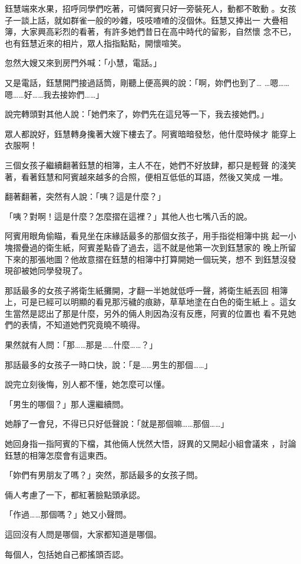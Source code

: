 鈺慧端來水果，招呼同學們吃著，可憐阿賓只好一旁裝死人，動都不敢動
。女孩子一談上話，就如群雀一般的吵雜，吱吱喳喳的沒個休。鈺慧又捧出一
大疊相簿，大家興高彩烈的看著，有許多她們昔日在高中時代的留影，自然懷
念不已，也有鈺慧近來的相片，眾人指指點點，開懷喧笑。

忽然大嫂又來到房門外喊：「小慧，電話。」

又是電話，鈺慧開門接過話筒，剛聽上便高興的說：「啊，妳們也到了…
…嗯……嗯……好……我去接妳們……」

說完轉頭對其他人說：「她們來了，妳們先在這兒等一下，我去接她們。」

眾人都說好，鈺慧轉身攙著大嫂下樓去了。阿賓暗暗發愁，他什麼時候才
能穿上衣服啊！

三個女孩子繼續翻著鈺慧的相簿，主人不在，她們不好放肆，都只是輕聲
的淺笑著，看著鈺慧和阿賓越來越多的合照，便相互低低的耳語，然後又笑成
一堆。

翻著翻著，突然有人說：「咦？這是什麼？」

「咦？對啊！這是什麼？怎麼摺在這裡？」其他人也七嘴八舌的說。

阿賓用眼角偷瞄，看見坐在床緣話最多的那個女孩子，用手指從相簿中挑
起一小塊摺疊過的衛生紙，阿賓差點昏了過去，這不就是他第一次到鈺慧家的
晚上所留下來的那張地圖？他故意摺在鈺慧的相簿中打算開她一個玩笑，想不
到鈺慧沒發現卻被她同學發現了。

那話最多的女孩子將衛生紙攤開，才翻一半她就低呼一聲，將衛生紙丟回
相簿上，可是已經可以明顯的看見那污穢的痕跡，草草地塗在白色的衛生紙上
。這女生當然是認出了那是什麼，另外的倆人則因為沒有反應，阿賓的位置也
看不見她們的表情，不知道她們究竟曉不曉得。

果然就有人問：「那……那是……什麼……？」

那話最多的女孩子一時口快，說：「是……男生的那個……」

說完立刻後悔，別人都不懂，她怎麼可以懂。

「男生的哪個？」那人還繼續問。

她靜了一會兒，不得已只好低聲說：「就是那個嘛……那個……」

她回身指一指阿賓的下檔，其他倆人恍然大悟，訝異的又開起小組會議來
，討論鈺慧的相簿怎麼會有這東西。

「妳們有男朋友了嗎？」突然，那話最多的女孩子問。

倆人考慮了一下，都紅著臉點頭承認。

「作過……那個嗎？」她又小聲問。

這回沒有人問是哪個，大家都知道是哪個。

每個人，包括她自己都搖頭否認。

